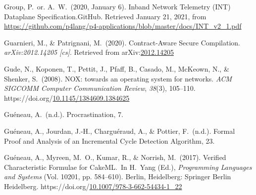 \documentclass[12pt,twoside]{article}
\begin{document}
{\begin{thebibliography}{1079}
\mdbibitemlabel{}Group, P.~or. A.~W.~(2020, January 6). Inband Network Telemetry (INT) Dataplane Specification.GitHub. Retrieved January 21, 2021, from \href{https://github.com/p4lang/p4-applications/blob/master/docs/INT_v2_1.pdf}{{\ttfamily https://\hspace{0pt}github.\hspace{0pt}com/\hspace{0pt}p4lang/\hspace{0pt}p4-\hspace{0pt}applications/\hspace{0pt}blob/\hspace{0pt}master/\hspace{0pt}docs/\hspace{0pt}INT\_\hspace{0pt}v2\_\hspace{0pt}1.\hspace{0pt}pdf}}%

\mdbibitemlabel{}Guarnieri, M., \& Patrignani, M.~(2020). Contract-Aware Secure Compilation. \emph{arXiv:2012.14205 {}[cs]}. Retrieved from arXiv:\href{http://arxiv.org/abs/2012.14205}{2012.14205}%

\mdbibitemlabel{}Gude, N., Koponen, T., Pettit, J., Pfaff, B., Casado, M., McKeown, N., \& Shenker, S.~(2008). NOX: towards an operating system for networks. \emph{ACM SIGCOMM Computer Communication Review}, \emph{38}(3), 105–110. https://doi.org/\href{https://dx.doi.org/10.1145/1384609.1384625}{10.1145/1384609.1384625}%

\mdbibitemlabel{}Guéneau, A.~(n.d.). Procrastination, 7.%

\mdbibitemlabel{}Guéneau, A., Jourdan, J.-H., Charguéraud, A., \& Pottier, F.~(n.d.). Formal Proof and Analysis of an Incremental Cycle Detection Algorithm, 23.%

\mdbibitemlabel{}Guéneau, A., Myreen, M.~O., Kumar, R., \& Norrish, M.~(2017). Verified Characteristic Formulae for CakeML.~In H.~Yang (Ed.), \emph{Programming Languages and Systems} (Vol. 10201, pp. 584–610). Berlin, Heidelberg: Springer Berlin Heidelberg. https://doi.org/\href{https://dx.doi.org/10.1007/978-3-662-54434-1_22}{10.1007/978-3-662-54434-1\_22}%


\end{thebibliography}}
\end{document}
